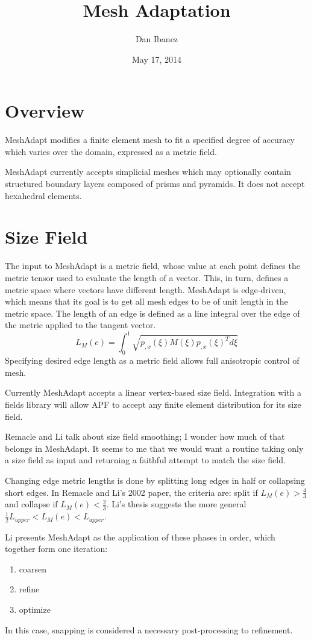 \documentclass{article}
\title{Mesh Adaptation}
\author{Dan Ibanez}
\date{May 17, 2014}
\begin{document}
\maketitle

\section{Overview}

MeshAdapt modifies a finite element mesh to fit
a specified degree of accuracy which varies over
the domain, expressed as a metric field.

MeshAdapt currently accepts simplicial meshes
which may optionally contain structured boundary
layers composed of prisms and pyramids.
It does not accept hexahedral elements.

\section{Size Field}

The input to MeshAdapt is a metric field, whose value
at each point defines the metric tensor used to
evaluate the length of a vector.
This, in turn, defines a metric space where vectors
have different length.
MeshAdapt is edge-driven, which means that its goal
is to get all mesh edges to be of unit length
in the metric space.
The length of an edge is defined as a line integral
over the edge of the metric applied to the tangent
vector.
\[L_M(e)=\int_0^1\sqrt{p_{,x}(\xi)M(\xi)p_{,x}(\xi)^Td\xi}\]
Specifying desired edge length as a metric field
allows full anisotropic control of mesh.

Currently MeshAdapt accepts a linear vertex-based
size field.
Integration with a fields library will allow APF
to accept any finite element distribution for its
size field. 

Remacle and Li talk about size field smoothing;
I wonder how much of that belongs in MeshAdapt.
It seems to me that we would want a routine
taking only a size field as input and returning
a faithful attempt to match the size field.

Changing edge metric lengths is done by splitting
long edges in half or collapsing short edges.
In Remacle and Li's 2002 paper, the criteria are:
split if $L_M(e) > \frac43$ and collapse if
$L_M(e)<\frac23$.
Li's thesis suggests the more general
$\frac12L_{upper} < L_M(e) < L_{upper}$.

Li presents MeshAdapt as the application of these
phases in order, which together form one iteration:
\begin{enumerate}
\item coarsen
\item refine
\item optimize
\end{enumerate}
In this case, snapping is considered a necessary
post-processing to refinement.
\end{document}
